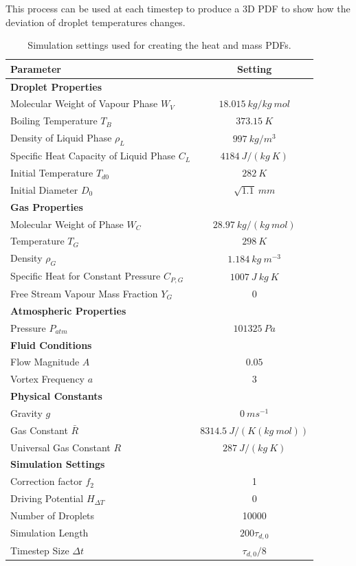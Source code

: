 \documentclass[../Interim_Report_Master]{subfiles}
\begin{document}
This process can be used at each timestep to produce a 3D PDF to show how the deviation of droplet temperatures changes.
\begin{table}[h]
	\centering
	\begin{tabular}{|l c|}
		\hline
		\large{\textbf{Parameter}} & \large{\textbf{Setting}} \\ \hline
		\textbf{Droplet Properties} &  \\
		Molecular Weight of Vapour Phase $W_V$ & $18.015~kg/kg~mol$ \\ 
		Boiling Temperature $T_B$ & $373.15~K$ \\ 
		Density of Liquid Phase $\rho_L$ & $997~kg/m^3$ \\
		Specific Heat Capacity of Liquid Phase $C_L$ & $4184~J/(kg~K)$ \\ 
		Initial Temperature $T_{d0}$ & $282~K$ \\ 
		Initial Diameter $D_0$ & $\sqrt{1.1}~mm$ \\ \hline 
		\textbf{Gas Properties} &  \\ 
		Molecular Weight of Phase $W_C$ & $28.97~kg/(kg~mol)$ \\ 
		Temperature $T_G$ & $298~K$ \\
		Density $\rho_G$ & $1.184~kg~m^{-3}$ \\ 
		Specific Heat for Constant Pressure $C_{P,G}$ & $1007~J~kg~K$ \\
		Free Stream Vapour Mass Fraction $Y_G$ & $0$ \\ \hline
		\textbf{Atmospheric Properties} &  \\ 
		Pressure $P_{atm}$ & $101325~Pa$ \\ \hline 
		\textbf{Fluid Conditions} & \\
		Flow Magnitude $A$ & $0.05$ \\
		Vortex Frequency $a$ & $3$ \\ \hline
		\textbf{Physical Constants} & \\
		Gravity $g$ & $0~ms^{-1}$ \\ 
		Gas Constant $\bar{R}$ & $8314.5~J/(K(kg~mol))$ \\ 
		Universal Gas Constant $R$ & $287~J/(kg~K)$ \\ \hline
		\textbf{Simulation Settings} & \\
		Correction factor $f_2$ & 1 \\
		Driving Potential $H_{\Delta T}$ & 0 \\ 
		Number of Droplets & 10000 \\ 
		Simulation Length & $200\tau_{d,0}$ \\
		Timestep Size $\Delta t$ & $\tau_{d,0}/8$ \\ \hline
	\end{tabular}
	\caption{Simulation settings used for creating the heat and mass PDFs.}
	\label{tab:sim_set}
\end{table}
\end{document}
